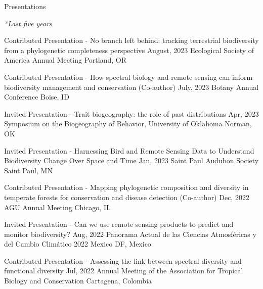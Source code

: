 \documentclass{resume} %
\begin{document}
\begin{rSection}{Presentations} 
\normalfont 

\em{*Last five years}

\begin{sSubsection}{Contributed Presentation - No branch left behind: tracking terrestrial biodiversity from a phylogenetic completeness perspective}{ \hfill }{August, 2023}{ Ecological Society of America Annual Meeting }{Portland, OR}
\end{sSubsection}

\begin{sSubsection}{Contributed Presentation - How spectral biology and remote sensing can inform biodiversity management and conservation}{ (Co-author) }{July, 2023}{ Botany Annual Conference }{Boise, ID}
\end{sSubsection}

\begin{sSubsection}{Invited Presentation - Trait biogeography: the role of past distributions}{ \hfill }{Apr, 2023}{ Symposium on the Biogeography of Behavior, University of Oklahoma }{Norman, OK}
\end{sSubsection}

\begin{sSubsection}{Invited Presentation - Harnessing Bird and Remote Sensing Data to Understand Biodiversity Change Over Space and Time}{ \hfill }{Jan, 2023}{ Saint Paul Audubon Society }{Saint Paul, MN}
\end{sSubsection}

\begin{sSubsection}{Contributed Presentation - Mapping phylogenetic composition and diversity in temperate forests for conservation and disease detection}{ (Co-author) }{Dec, 2022}{ AGU Annual Meeting }{Chicago, IL}
\end{sSubsection}

\begin{sSubsection}{Invited Presentation - Can we use remote sensing products to predict and monitor biodiversity?}{ \hfill }{Aug, 2022}{ Panorama Actual de las Ciencias Atmosféricas y del Cambio Climático 2022 }{Mexico DF, Mexico}
\end{sSubsection}

\begin{sSubsection}{Contributed Presentation - Assessing the link between spectral diversity and functional diversity}{ \hfill }{Jul, 2022}{ Annual Meeting of the Association for Tropical Biology and Conservation }{Cartagena, Colombia}
\end{sSubsection}


\end{rSection}
\end{document}
